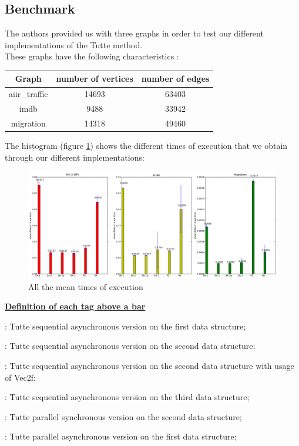 \subsection{Benchmark}

The authors provided us with three graphs in order to test our
different implementations of the Tutte method.\\

These graphs have the following characteristics :

\begin{center}
\begin{tabular}{|c|c|c|}
\hline
Graph & number of vertices & number of edges \\
\hline
aiir\_traffic & 14693 & 63403\\
imdb & 9488 & 33942\\
migration & 14318 & 49460\\
\hline
\end{tabular}
\end{center}


The histogram (figure \ref{histo}) shows the different times of execution
that we obtain through our different implementations:

\begin{figure}[!h]
  \centering
  \includegraphics[scale=0.4]{img/histogramme.png}
  \caption{All the mean times of execution}
  \label{histo}
\end{figure}

\underline{\bf Definition of each tag above a bar}
\begin{dinglist}{70}
\item [SA 1]: Tutte sequential asynchronous version on the first data structure;
\item [SA 2]: Tutte sequential asynchronous version on the second data structure;
\item [SA 2b]: Tutte sequential asynchronous version on the second data structure with usage of Vec2f;
\item [SA 3]: Tutte sequential asynchronous version on the third data structure;
\item [PS]: Tutte parallel synchronous version on the second data structure;
\item [PA]: Tutte parallel asynchronous version on the first data structure;
\end{dinglist}


